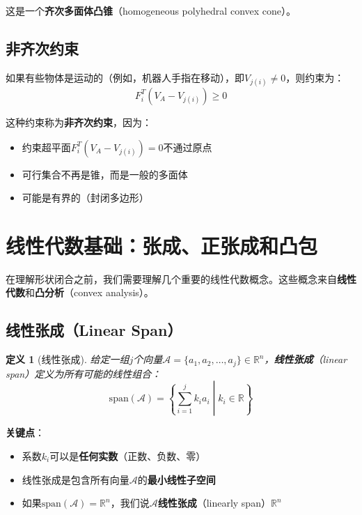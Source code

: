 \documentclass[12pt,a4paper]{article}
\newtheorem{definition}{定义}
\begin{document}
这是一个\textbf{齐次多面体凸锥}（homogeneous polyhedral convex cone）。

\subsection{非齐次约束}

如果有些物体是运动的（例如，机器人手指在移动），即$V_{j(i)} \neq 0$，则约束为：
\begin{equation}
F_i^T (V_A - V_{j(i)}) \geq 0
\label{eq:nonhomogeneous}
\end{equation}

这种约束称为\textbf{非齐次约束}，因为：
\begin{itemize}
\item 约束超平面$F_i^T (V_A - V_{j(i)}) = 0$不通过原点
\item 可行集合不再是锥，而是一般的多面体
\item 可能是有界的（封闭多边形）
\end{itemize}

\section{线性代数基础：张成、正张成和凸包}

在理解形状闭合之前，我们需要理解几个重要的线性代数概念。这些概念来自\textbf{线性代数}和\textbf{凸分析}（convex analysis）。

\subsection{线性张成（Linear Span）}

\begin{definition}[线性张成]
给定一组$j$个向量$\mathcal{A} = \{a_1, a_2, \ldots, a_j\} \in \mathbb{R}^n$，\textbf{线性张成}（linear span）定义为所有可能的线性组合：
\begin{equation}
\text{span}(\mathcal{A}) = \left\{\sum_{i=1}^j k_i a_i \middle| k_i \in \mathbb{R} \right\}
\label{eq:linear_span}
\end{equation}
\end{definition}

\textbf{关键点}：
\begin{itemize}
\item 系数$k_i$可以是\textbf{任何实数}（正数、负数、零）
\item 线性张成是包含所有向量$\mathcal{A}$的\textbf{最小线性子空间}
\item 如果$\text{span}(\mathcal{A}) = \mathbb{R}^n$，我们说$\mathcal{A}$\textbf{线性张成}（linearly span）$\mathbb{R}^n$
\end{itemize}
\end{document}
